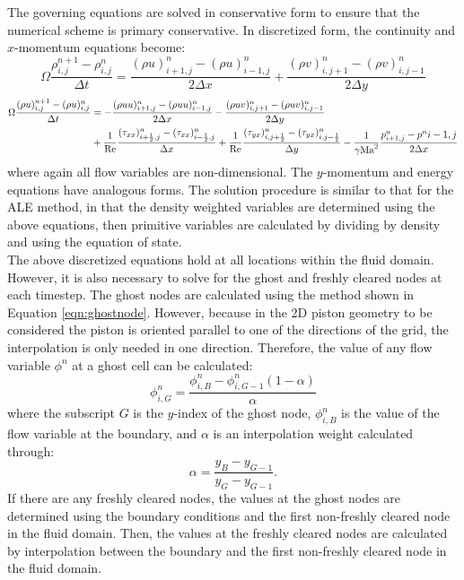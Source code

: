 \documentclass{article}
\begin{document}
The governing equations are solved in conservative form to ensure that the numerical scheme is primary conservative. In discretized form,  the continuity and $x$-momentum equations become:
\begin{equation}
\Omega \frac{\rho_{i,j}^{n+1} - \rho_{i,j}^n}{\Delta t} = \frac{(\rho u)_{i+1,j}^{n} - (\rho u)_{i-1,j}^n}{2 \Delta x} + \frac{(\rho v)_{i,j+1}^{n} - (\rho v)_{i,j-1}^n}{2 \Delta y}
\end{equation}
\begin{equation}
\begin{aligned}
\Omega \frac{(\rho u)_{i,j}^{n+1} - (\rho u)_{i,j}^n}{\Delta t} 
&= - \frac{(\rho u u)_{i+1,j}^{n} - (\rho u u)_{i-1,j}^n}{2 \Delta x} 
- \frac{(\rho u v)_{i,j+1}^{n} - (\rho u v)_{i,j-1}^n}{2 \Delta y}  \\
&+ \frac{1}{\rm{Re}}\frac{(\tau_{xx})^n_{i+\frac{1}{2},j} -  (\tau_{xx})^n_{i-\frac{1}{2},j}}{\Delta x}
+ \frac{1}{\rm{Re}}
\frac{(\tau_{yx})^n_{i,j+\frac{1}{2}} -  (\tau_{yx})^n_{i,j-\frac{1}{2}}}{\Delta y}
- \frac{1}{\gamma \rm{Ma}^2} \frac{p^n_{i+1,j} - p^n{i-1,j}}{2 \Delta x}
\end{aligned}
\end{equation}
where again all flow variables are non-dimensional. The $y$-momentum and energy equations have analogous forms. The solution procedure is similar to that for the ALE method, in that the density weighted variables are determined using the above equations, then primitive variables are calculated by dividing by density and using the equation of state. \\

The above discretized equations hold at all locations within the fluid domain. However, it is also necessary to solve for the ghost and freshly cleared nodes at each timestep. The ghost nodes are calculated using the method shown in Equation \ref{eqn:ghostnode}. However, because in the 2D piston geometry to be considered the piston is oriented parallel to one of the directions of the grid, the interpolation is only needed in one direction. Therefore, the value of any flow variable $\phi^n$ at a ghost cell can be calculated:
\begin{equation}
\phi^n_{i,G} = \frac{\phi_{i,B}^n - \phi^n_{i,G-1} (1- \alpha)}{\alpha}
\end {equation} 
where the subscript $G$ is the $y$-index of the ghost node, $\phi_{i,B}^n$ is the value of the flow variable at the boundary, and $\alpha$ is an interpolation weight calculated through:
\begin{equation}
\alpha = \frac{y_B - y_{G-1}}{y_G - y_{G-1}}.
\end{equation} 
If there are any freshly cleared nodes, the values at the ghost nodes are determined using the boundary conditions and the first non-freshly cleared node in the fluid domain. Then, the values at the freshly cleared nodes are calculated by interpolation between the boundary and the first non-freshly cleared node in the fluid domain.
\end{document}
